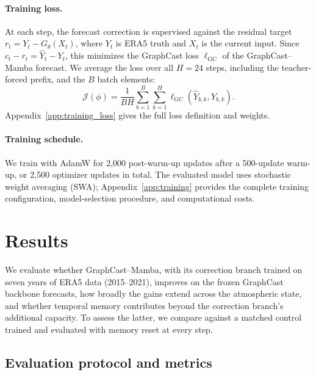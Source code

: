 \documentclass{article}
\newcommand{\vfourchange}[1]{{\color{blue}#1}}
\begin{document}
\paragraph{Training loss.}
At each step, the forecast correction is supervised against the residual target $r_t=Y_t-G_\theta(X_t)$, where $Y_t$ is ERA5 truth and $X_t$ is the current input. Since $c_t-r_t=\hat{Y}_t-Y_t$, this minimizes the {GraphCast loss} $\ell_{\mathrm{GC}}$ of the GraphCast--Mamba forecast. We average the loss over all $H=24$ steps, including the teacher-forced prefix, and the $B$ batch elements:
\begin{equation}
    \mathcal{J}(\phi)
    =\frac{1}{BH}\sum_{b=1}^{B}\sum_{k=1}^{H}
      \ell_{\mathrm{GC}}(\hat{Y}_{b,k},Y_{b,k}).
    \label{eq:training_objective}
\end{equation}
Appendix~\ref{app:training_loss} gives the full loss definition and weights.

\paragraph{Training schedule.}
We train with AdamW for 2,000 post-warm-up updates after a 500-update warm-up, or 2,500 optimizer updates in total. The evaluated model uses stochastic weight averaging (SWA); Appendix~\ref{app:training} \vfourchange{provides the complete training configuration, model-selection procedure, and computational costs.}


\section{Results}
\label{sec:numerical}

We evaluate whether GraphCast--Mamba, with its correction branch trained on seven years of ERA5 data (2015--2021), improves on the frozen GraphCast backbone forecasts, how broadly the gains extend across the atmospheric state, and whether temporal memory contributes beyond the correction branch's additional capacity. \vfourchange{To assess the latter, we compare against a matched control trained and evaluated with memory reset at every step.}

\subsection{Evaluation protocol and metrics}
\label{sec:eval_protocol}
\end{document}
